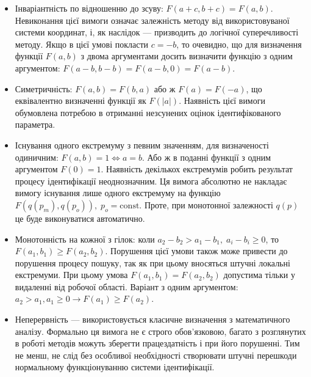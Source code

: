 \begin{itemize}

  \item
    Інваріантність по відношенню до зсуву:
    $F(a+c,b+c) = F(a,b)$.
    Невиконання цієї вимоги означає залежність методу від
    використовуваної системи координат, і, як наслідок --- призводить
    до логічної суперечливості методу. Якщо в цієї умові покласти
    $ c = -b $, то очевидно, що для визначення функції
    $ F (a, b) $ з двома аргументами досить визначити функцію з одним
    аргументом: $ F (a-b, b-b) = F (a-b, 0 ) = F (a-b) $.

  \item
    Симетричність:
    $ F (a, b) = F (b, a) $ або ж
    $F (a) = F (-a) $, що еквівалентно визначенні функції як
    $F(|a|) $. Наявність цієї вимоги обумовлена потребою в отриманні
    незсунених оцінок ідентифікованого параметра.

  \item
    Існування одного екстремуму
    з певним значенням, для визначеності одиничним:
    $F(a,b) = 1  \Leftrightarrow a = b $.
    Або ж в поданні функції з одним аргументом
    $ F (0) = 1 $. Наявність декількох екстремумів робить результат
    процесу ідентифікації неоднозначним. Ця вимога абсолютно не
    накладає вимогу існування лише одного екстремуму на функцію
    $ F (q (p_m), q (p_o)), \; p_o = \mathrm{const} $. Проте, при монотонної залежності
    $q(p)$ це буде виконуватися автоматично.

  \item
    Монотонність на кожної з гілок:
    коли $ a_2-b_2 > a_1-b_1, \; a_i-b_i \ge 0$, то $F(a_1,b_1) \ge F(a_2,b_2)$.
    Порушення цієї умови також може привести до порушення
    процесу пошуку, так як при цьому вносяться штучні локальні
    екстремуми. При цьому умова
    $ F (a_1, b_1) = F (a_2, b_2) $ допустима тільки у видаленні від робочої
    області. Варіант з одним аргументом:
    $ a_2 > a_1, a_1 \ge 0 \to F(a_1) \ge F(a_2)$.

  \item
    Неперервність ---
    використовується класичне визначення з математичного
    аналізу. Формально ця вимога не є строго обов'язковою, багато з
    розглянутих в роботі методів можуть зберегти працездатність
    і при його порушенні. Тим не менш, не слід без особливої
    необхідності створювати штучні перешкоди нормальному
    функціонуванню системи ідентифікації.

\end{itemize}

